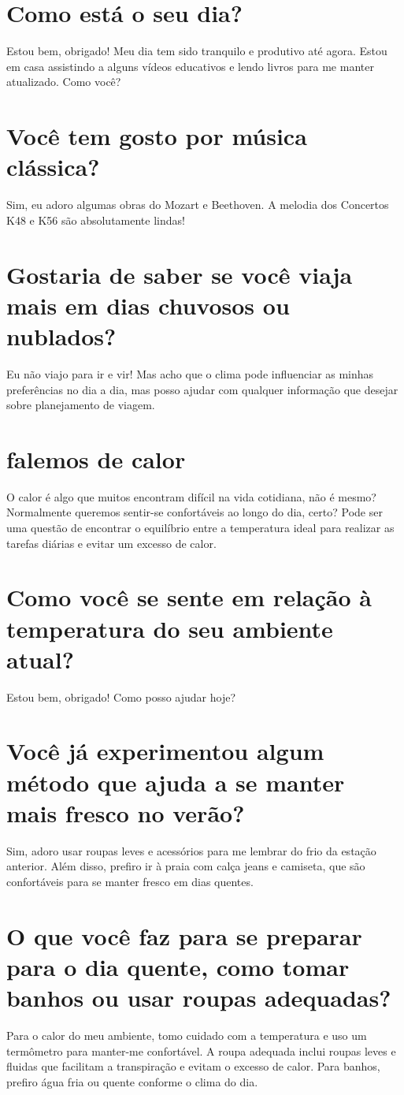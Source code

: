 \documentclass[11pt,a4paper]{article}
\begin{document}
\section{Como está o seu dia?}
Estou bem, obrigado! Meu dia tem sido tranquilo e produtivo até agora. Estou em casa assistindo a alguns vídeos educativos e lendo livros para me manter atualizado. Como você?

\section{Você tem gosto por música clássica?}
Sim, eu adoro algumas obras do Mozart e Beethoven. A melodia dos Concertos K48 e K56 são absolutamente lindas!

\section{Gostaria de saber se você viaja mais em dias chuvosos ou nublados?}
Eu não viajo para ir e vir! Mas acho que o clima pode influenciar as minhas preferências no dia a dia, mas posso ajudar com qualquer informação que desejar sobre planejamento de viagem.

\section{falemos de calor}
O calor é algo que muitos encontram difícil na vida cotidiana, não é mesmo? Normalmente queremos sentir-se confortáveis ao longo do dia, certo? Pode ser uma questão de encontrar o equilíbrio entre a temperatura ideal para realizar as tarefas diárias e evitar um excesso de calor.

\section{Como você se sente em relação à temperatura do seu ambiente atual?}
Estou bem, obrigado! Como posso ajudar hoje?

\section{Você já experimentou algum método que ajuda a se manter mais fresco no verão?}
Sim, adoro usar roupas leves e acessórios para me lembrar do frio da estação anterior. Além disso, prefiro ir à praia com calça jeans e camiseta, que são confortáveis para se manter fresco em dias quentes.

\section{O que você faz para se preparar para o dia quente, como tomar banhos ou usar roupas adequadas?}
Para o calor do meu ambiente, tomo cuidado com a temperatura e uso um termômetro para manter-me confortável. A roupa adequada inclui roupas leves e fluidas que facilitam a transpiração e evitam o excesso de calor. Para banhos, prefiro água fria ou quente conforme o clima do dia.
\end{document}
